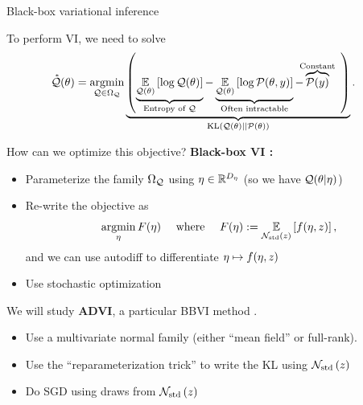 \documentclass[8pt]{beamer}\usepackage[]{graphicx}\usepackage[]{color}
\begin{document}
\begin{frame}[t]{Black-box variational inference}

To perform VI, we need to solve
%
\begin{align*}
%
\qstar(\theta) &= \argmin_{\q \in \qdom} 
\undernote{
\left( 
\undernote{
    \expect{\q(\theta)}{\log \q(\theta)}
    }{\textrm{Entropy of }\q} - 
\undernote{
    \expect{\q(\theta)}{\log \p(\theta, \y)}
}{\textrm{Often intractable}}
 - \overnote{\p(\y)}{\textrm{Constant}}
\quad\right)}{\kl{\q(\theta)}{\p(\theta)}}.
%
\end{align*}

How can we optimize this objective?
\pause
\textbf{Black-box VI \citep{ranganath:2014:bbvi}: }
%
\begin{itemize}
    \item Parameterize the family $\Omega_{\mathcal{Q}}$ using $\eta \in \mathbb{R}^{{D_{\eta}}}$ (so we have $\mathcal{Q}(\theta \vert \eta)$)
    \item Re-write the objective as 
    \begin{align*}
        \operatorname*{\mathrm{argmin}}_{\eta} F(\eta)
        \quad\text{ where }\quad F(\eta) := \underset{\mathcal{N}_{\mathrm{std}}\left(z\right)}{\mathbb{E}}\left[f(\eta, z)\right],
    \end{align*}
    and we can use autodiff to differentiate $\eta \mapsto f(\eta, z)$
    \item Use stochastic optimization
\end{itemize}

\pause




We will study \textbf{ADVI}, a particular BBVI method
\citep{kucukelbir:2017:advi}.

\begin{itemize}
    \item Use a multivariate normal family (either ``mean field'' or full-rank).
    \item Use the ``reparameterization trick'' to write the KL using $\mathcal{N}_{\mathrm{std}}\left(z\right)$
    \item Do SGD using draws from $\mathcal{N}_{\mathrm{std}}\left(z\right)$
\end{itemize}


\end{frame}
\end{document}
